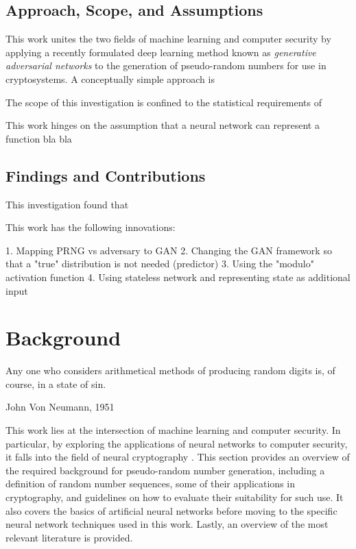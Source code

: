 \documentclass[12pt, titlepage]{report}
\theoremstyle{definition}
\begin{document}
\section{Approach, Scope, and Assumptions}
This work unites the two fields of machine learning and computer security by applying a recently formulated deep learning method known as \emph{generative adversarial networks} \cite{goodfellow2014generative} to the generation of pseudo-random numbers for use in cryptosystems. A conceptually simple approach is 

The scope of this investigation is confined to the statistical requirements of 

This work hinges on the assumption that a neural network can represent a function bla bla

\section{Findings and Contributions}
This investigation found that 

This work has the following innovations: 

1. Mapping PRNG vs adversary to GAN
2. Changing the GAN framework so that a "true" distribution is not needed (predictor)
3. Using the "modulo" activation function
4. Using stateless network and representing state as additional input




\chapter{Background}\label{chapter:background}
\epigraph{Any one who considers arithmetical methods of producing random digits is, of course, in a state of sin.}{John Von Neumann, 1951}

This work lies at the intersection of machine learning and computer security. In particular, by exploring the applications of neural networks to computer security, it falls into the field of neural cryptography \cite{klimov2002analysis}. This section provides an overview of the required background for pseudo-random number generation, including a definition of random number sequences, some of their applications in cryptography, and guidelines on how to evaluate their suitability for such use. It also covers the basics of artificial neural networks before moving to the specific neural network techniques used in this work. Lastly, an overview of the most relevant literature is provided.
\end{document}
